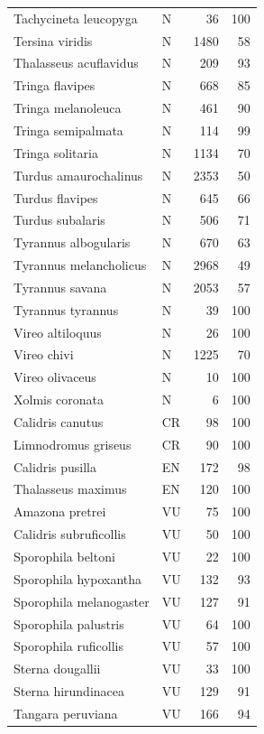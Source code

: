 \documentclass[
]{scrbook}
\begin{document}
\begin{table}
\begin{tabular}{llrr}
Tachycineta leucopyga & N & 36 & 100\\
\addlinespace
Tersina viridis & N & 1480 & 58\\
Thalasseus acuflavidus & N & 209 & 93\\
Tringa flavipes & N & 668 & 85\\
Tringa melanoleuca & N & 461 & 90\\
Tringa semipalmata & N & 114 & 99\\
\addlinespace
Tringa solitaria & N & 1134 & 70\\
Turdus amaurochalinus & N & 2353 & 50\\
Turdus flavipes & N & 645 & 66\\
Turdus subalaris & N & 506 & 71\\
Tyrannus albogularis & N & 670 & 63\\
\addlinespace
Tyrannus melancholicus & N & 2968 & 49\\
Tyrannus savana & N & 2053 & 57\\
Tyrannus tyrannus & N & 39 & 100\\
Vireo altiloquus & N & 26 & 100\\
Vireo chivi & N & 1225 & 70\\
\addlinespace
Vireo olivaceus & N & 10 & 100\\
Xolmis coronata & N & 6 & 100\\
Calidris canutus & CR & 98 & 100\\
Limnodromus griseus & CR & 90 & 100\\
Calidris pusilla & EN & 172 & 98\\
\addlinespace
Thalasseus maximus & EN & 120 & 100\\
Amazona pretrei & VU & 75 & 100\\
Calidris subruficollis & VU & 50 & 100\\
Sporophila beltoni & VU & 22 & 100\\
Sporophila hypoxantha & VU & 132 & 93\\
\addlinespace
Sporophila melanogaster & VU & 127 & 91\\
Sporophila palustris & VU & 64 & 100\\
Sporophila ruficollis & VU & 57 & 100\\
Sterna dougallii & VU & 33 & 100\\
Sterna hirundinacea & VU & 129 & 91\\
\addlinespace
Tangara peruviana & VU & 166 & 94\\
\bottomrule
\end{tabular}
\end{table}
\end{document}
